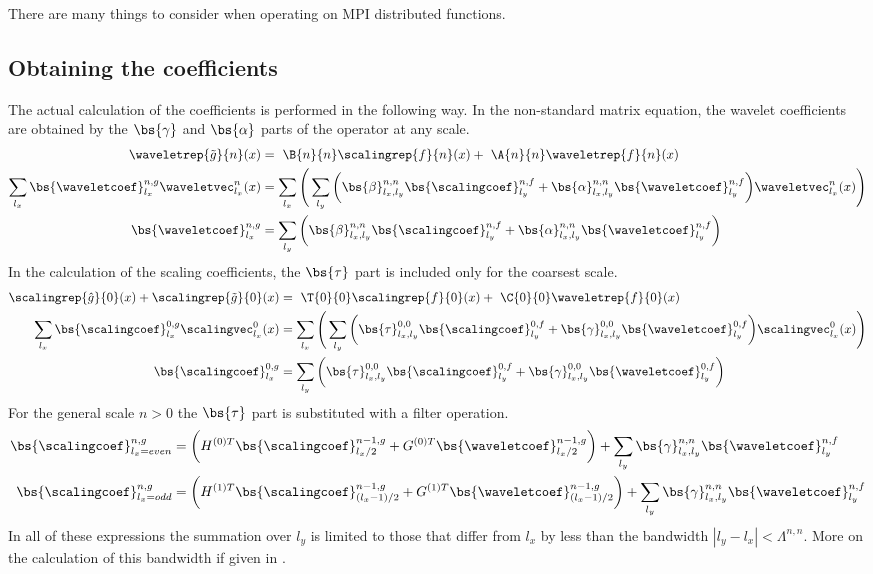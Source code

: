 There are many things to consider when operating on MPI distributed functions.

\subsection{Obtaining the coefficients}
The actual calculation of the coefficients is performed in the following way.
In the non-standard matrix equation, the wavelet coefficients are obtained by the 
$\bs{\gamma}$ and $\bs{\alpha}$ parts of the operator at any scale.
\begin{align}
    \nonumber
    \waveletrep{\tilde{g}}{n}(x) &=\ \B{n}{n}\scalingrep{f}{n}(x) +\ 
	\A{n}{n}\waveletrep{f}{n}(x)\\
    \nonumber
    \sum_{l_x} \bs{\waveletcoef}^{n,g}_{l_x}\waveletvec^n_{l_x}(x)
	&= \sum_{l_x}\Bigg(\sum_{l_y}
	\bigg(
	\bs{\beta}^{n,n}_{l_x,l_y}\bs{\scalingcoef}^{n,f}_{l_y} +
	\bs{\alpha}^{n,n}_{l_x,l_y}\bs{\waveletcoef}^{n,f}_{l_y}\bigg)
	\waveletvec_{l_x}^n(x)\Bigg)\\
    \bs{\waveletcoef}^{n,g}_{l_x} &= 
	\sum_{l_y}\bigg(
	\bs{\beta}^{n,n}_{l_x,l_y}\bs{\scalingcoef}^{n,f}_{l_y} + 
	\bs{\alpha}^{n,n}_{l_x,l_y}\bs{\waveletcoef}^{n,f}_{l_y}\bigg)
\end{align}
In the calculation of the scaling coefficients, the $\bs{\tau}$ part is
included only for the coarsest scale.
\begin{align}
    \nonumber
    \scalingrep{\hat{g}}{0}(x) + \scalingrep{\tilde{g}}{0}(x) 
    &=\ \T{0}{0}\scalingrep{f}{0}(x) +\ \C{0}{0}\waveletrep{f}{0}(x)\\
    \nonumber
    \sum_{l_x} \bs{\scalingcoef}^{0,g}_{l_x}\scalingvec^0_{l_x}(x)
	&= \sum_{l_x}\Bigg(\sum_{l_y}
	\bigg(
	\bs{\tau}^{0,0}_{l_x,l_y}\bs{\scalingcoef}^{0,f}_{l_y} +
	\bs{\gamma}^{0,0}_{l_x,l_y}\bs{\waveletcoef}^{0,f}_{l_y}\bigg)
	\scalingvec_{l_x}^0(x)\Bigg)\\
    \bs{\scalingcoef}^{0,g}_{l_x} &= 
	\sum_{l_y}\bigg(
	\bs{\tau}^{0,0}_{l_x,l_y}\bs{\scalingcoef}^{0,f}_{l_y} + 
	\bs{\gamma}^{0,0}_{l_x,l_y}\bs{\waveletcoef}^{0,f}_{l_y}\bigg)
\end{align}
For the general scale $n>0$ the $\bs{\tau}$ part is substituted with a
filter operation.
\begin{align}
    \begin{split}
    \bs{\scalingcoef}^{n,g}_{l_x=even} &= \bigg(H^{(0)T}
	\bs{\scalingcoef}^{n-1,g}_{l_x/2} +
	G^{(0)T}\bs{\waveletcoef}^{n-1,g}_{l_x/2}\bigg) + \sum_{l_y}
	\bs{\gamma}^{n,n}_{l_x,l_y}\bs{\waveletcoef}^{n,f}_{l_y}\\
    \bs{\scalingcoef}^{n,g}_{l_x=odd} &= \bigg(H^{(1)T}
	\bs{\scalingcoef}^{n-1,g}_{(l_x-1)/2} +
	G^{(1)T}\bs{\waveletcoef}^{n-1,g}_{(l_x-1)/2}\bigg) + \sum_{l_y}
	\bs{\gamma}^{n,n}_{l_x,l_y}\bs{\waveletcoef}^{n,f}_{l_y}
    \end{split}
\end{align}
In all of these expressions the summation over $l_y$ is limited to those that
differ from $l_x$ by less than the bandwidth $|l_y-l_x| < \Lambda^{n,n}$. More
on the calculation of this bandwidth if given in \cite{Fossgaard}.

